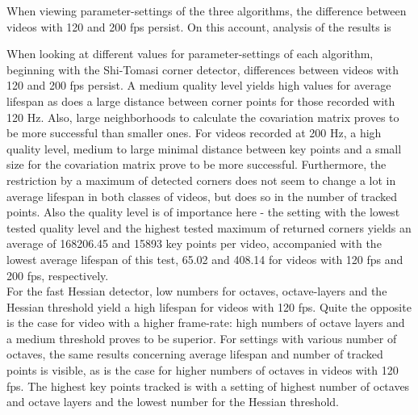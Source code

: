 \documentclass[Bachelorarbeit.tex]{subfiles}
\begin{document}

When viewing parameter-settings of the three algorithms, the difference between videos with 120 and 200 fps persist. On this account, analysis of the results is 

When looking at different values for parameter-settings of each algorithm, beginning with the Shi-Tomasi corner detector, differences between videos with 120 and 200 fps persist. A medium quality level yields high values for average lifespan as does a large distance between corner points for those recorded with 120 Hz. Also, large neighborhoods to calculate the covariation matrix proves to be more successful than smaller ones. 
For videos recorded at 200 Hz, a high quality level, medium to large minimal distance between key points and a small size for the covariation matrix prove to be more successful. Furthermore, the restriction by a maximum of detected corners does not seem to change a lot in average lifespan in both classes of videos, but does so in the number of tracked points. Also the quality level is of importance here - the setting with the lowest tested quality level and the highest tested maximum of returned corners yields an average of 168206.45 and 15893 key points per video, accompanied with the lowest average lifespan of this test, 65.02 and 408.14 for videos with 120 fps and 200 fps, respectively.\\

For the fast Hessian detector, low numbers for octaves, octave-layers and the Hessian threshold yield a high lifespan for videos with 120 fps. Quite the opposite is the case for video with a higher frame-rate: high numbers of octave layers and a medium threshold proves to be superior. For settings with various number of octaves, the same results concerning average lifespan and number of tracked points is visible, as is the case for higher numbers of octaves in videos with 120 fps. The highest key points tracked is with a setting of highest number of octaves and octave layers and the lowest number for the Hessian threshold.
\end{document}

